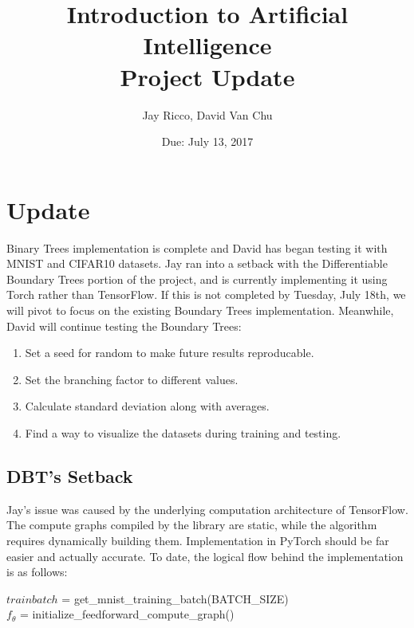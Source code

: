 \documentclass[10pt,letterpaper]{article}
\author{Jay Ricco, David Van Chu}
\title{Introduction to Artificial Intelligence\\Project Update}
\date{Due: July 13, 2017}
\begin{document}
	\maketitle
	\section{Update}
		Binary Trees implementation is complete and David has began testing it with MNIST and CIFAR10 datasets.
		Jay ran into a setback with the Differentiable Boundary Trees portion of the project, and is currently implementing it using Torch rather than TensorFlow. If this is not completed by Tuesday, July 18th, we will pivot to focus on the existing Boundary Trees implementation. Meanwhile, David will continue testing the Boundary Trees:
		\begin{enumerate}
			\item Set a seed for random to make future results reproducable.
			\item Set the branching factor to different values.
			\item Calculate standard deviation along with averages.
			\item Find a way to visualize the datasets during training and testing.
		\end{enumerate}
		\subsection{DBT's Setback}
			Jay's issue was caused by the underlying computation architecture of TensorFlow. The compute graphs compiled by the library are static, while the algorithm requires dynamically building them. Implementation in PyTorch should be far easier and actually accurate. To date, the logical flow behind the implementation is as follows:\\
			\begin{algorithm}
				\SetAlgoLined
				$trainbatch$ = get\_mnist\_training\_batch(BATCH\_SIZE)\\
				$f_{\theta}$ = initialize\_feedforward\_compute\_graph()\\
			\end{algorithm}
			
\end{document}
